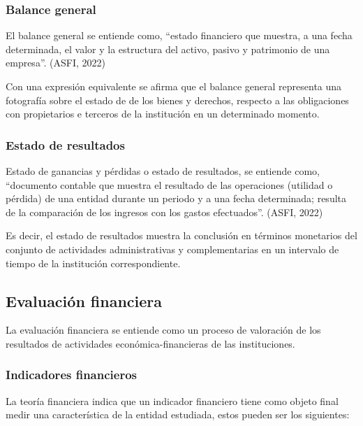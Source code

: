 \documentclass[
  12pt,
]{article}
\begin{document}
\hypertarget{balance-general}{%
\subsubsection{Balance general}\label{balance-general}}

El balance general se entiende como, ``estado financiero que muestra, a
una fecha determinada, el valor y la estructura del activo, pasivo y
patrimonio de una empresa''. (ASFI, 2022)

Con una expresión equivalente se afirma que el balance general
representa una fotografía sobre el estado de de los bienes y derechos,
respecto a las obligaciones con propietarios e terceros de la
institución en un determinado momento.

\hypertarget{estado-de-resultados}{%
\subsubsection{Estado de resultados}\label{estado-de-resultados}}

Estado de ganancias y pérdidas o estado de resultados, se entiende como,
``documento contable que muestra el resultado de las operaciones
(utilidad o pérdida) de una entidad durante un periodo y a una fecha
determinada; resulta de la comparación de los ingresos con los gastos
efectuados''. (ASFI, 2022)

Es decir, el estado de resultados muestra la conclusión en términos
monetarios del conjunto de actividades administrativas y complementarias
en un intervalo de tiempo de la institución correspondiente.

\hypertarget{evaluaciuxf3n-financiera}{%
\subsection{Evaluación financiera}\label{evaluaciuxf3n-financiera}}

La evaluación financiera se entiende como un proceso de valoración de
los resultados de actividades económica-financieras de las
instituciones.

\hypertarget{indicadores-financieros}{%
\subsubsection{Indicadores financieros}\label{indicadores-financieros}}

La teoría financiera indica que un indicador financiero tiene como
objeto final medir una característica de la entidad estudiada, estos
pueden ser los siguientes:
\end{document}
